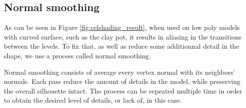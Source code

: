 \documentclass{article}
\begin{document}
\subsection{Normal smoothing}

As can be seen in Figure \ref{fig:celshading_result}, when used on low poly models with curved surface,
such as the clay pot, it results in aliasing in the transitions between the levels. To fix that, as well as
reduce some additionnal detail in the shape, we use a process called normal smoothing.

\medskip \par
\noindent
Normal smoothing consists of average every vertex normal with its neighbors' normals. Each pass reduce 
the amount of details in the model, while preserving the overall silhouette intact.
The process can be repeated multiple time in order to obtain the desired level of details, 
or lack of, in this case.
\end{document}

